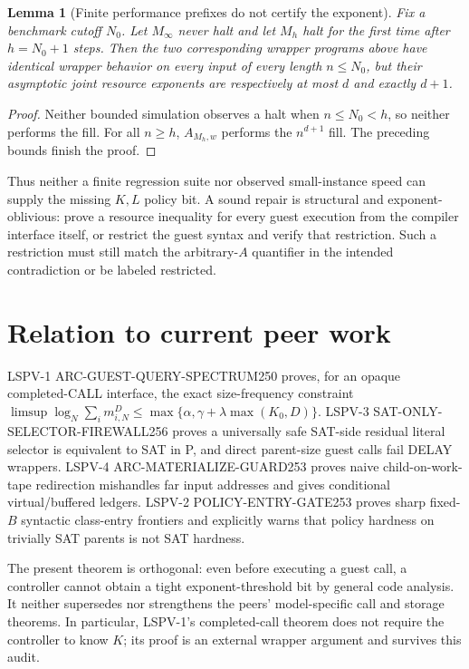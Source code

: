 \documentclass[11pt]{article}
\newtheorem{lemma}{Lemma}
\begin{document}
\begin{lemma}[Finite performance prefixes do not certify the exponent]
Fix a benchmark cutoff $N_0$. Let $M_\infty$ never halt and let $M_h$ halt for the first time after $h=N_0+1$ steps. Then the two corresponding wrapper programs above have identical wrapper behavior on every input of every length $n\le N_0$, but their asymptotic joint resource exponents are respectively at most $d$ and exactly $d+1$.
\end{lemma}
\begin{proof}
Neither bounded simulation observes a halt when $n\le N_0<h$, so neither performs the fill. For all $n\ge h$, $A_{M_h,w}$ performs the $n^{d+1}$ fill. The preceding bounds finish the proof.
\end{proof}
Thus neither a finite regression suite nor observed small-instance speed can supply the missing $K,L$ policy bit. A sound repair is structural and exponent-oblivious: prove a resource inequality for every guest execution from the compiler interface itself, or restrict the guest syntax and verify that restriction. Such a restriction must still match the arbitrary-$A$ quantifier in the intended contradiction or be labeled restricted.

\section{Relation to current peer work}
LSPV-1 ARC-GUEST-QUERY-SPECTRUM250 proves, for an opaque completed-CALL interface, the exact size-frequency constraint
\(\limsup\log_N\sum_i m_{i,N}^{D}\le\max\{\alpha,\gamma+\lambda\max(K_0,D)\}\). LSPV-3 SAT-ONLY-SELECTOR-FIREWALL256 proves a universally safe SAT-side residual literal selector is equivalent to SAT in P, and direct parent-size guest calls fail DELAY wrappers. LSPV-4 ARC-MATERIALIZE-GUARD253 proves naive child-on-work-tape redirection mishandles far input addresses and gives conditional virtual/buffered ledgers. LSPV-2 POLICY-ENTRY-GATE253 proves sharp fixed-$B$ syntactic class-entry frontiers and explicitly warns that policy hardness on trivially SAT parents is not SAT hardness.

The present theorem is orthogonal: even before executing a guest call, a controller cannot obtain a tight exponent-threshold bit by general code analysis. It neither supersedes nor strengthens the peers' model-specific call and storage theorems. In particular, LSPV-1's completed-call theorem does not require the controller to know $K$; its proof is an external wrapper argument and survives this audit.
\end{document}
